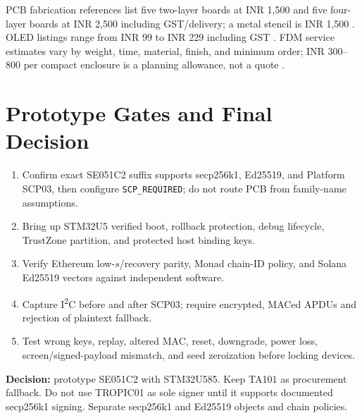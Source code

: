\documentclass[10pt]{article}
\begin{document}
PCB fabrication references list five two-layer boards at INR 1,500 and five
four-layer boards at INR 2,500 including GST/delivery; a metal stencil is
INR 1,500 \cite{pcb-fab-cost}. OLED listings range from INR 99 to INR 229
including GST \cite{oled-cost}. FDM service estimates vary by weight, time,
material, finish, and minimum order; INR 300--800 per compact enclosure is a
planning allowance, not a quote \cite{print-cost}.

\section{Prototype Gates and Final Decision}
\begin{enumerate}
  \item Confirm exact SE051C2 suffix supports secp256k1, Ed25519, and Platform
        SCP03, then configure \texttt{SCP\_REQUIRED}; do not
        route PCB from family-name assumptions.
  \item Bring up STM32U5 verified boot, rollback protection, debug lifecycle,
        TrustZone partition, and protected host binding keys.
  \item Verify Ethereum low-$s$/recovery parity, Monad chain-ID policy, and
        Solana Ed25519 vectors against independent software.
  \item Capture I\textsuperscript{2}C before and after SCP03; require encrypted,
        MACed APDUs and rejection of plaintext fallback.
  \item Test wrong keys, replay, altered MAC, reset, downgrade, power loss,
        screen/signed-payload mismatch, and seed zeroization before locking devices.
\end{enumerate}

\textbf{Decision:} prototype SE051C2 with STM32U585. Keep TA101 as procurement
fallback. Do not use TROPIC01 as sole signer until it supports documented
secp256k1 signing. Separate secp256k1 and Ed25519 objects and chain policies.
\end{document}
